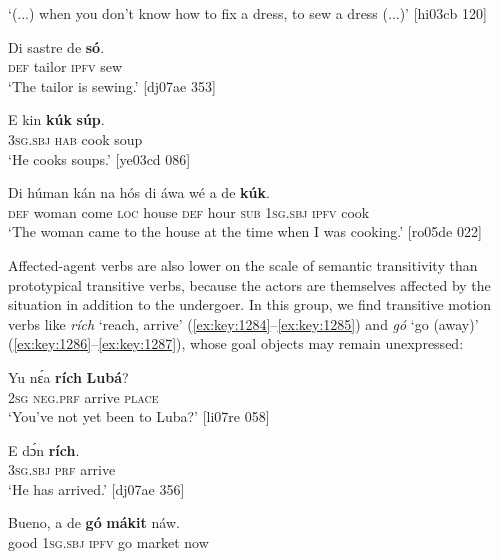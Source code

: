 \glt ‘(...) when you don’t know how to fix a dress, to sew a dress (...)’ [hi03cb 120]
\z


\ea%
    \label{ex:key:1281}
    \gll Di  sastre  de    \textbf{só}.\\
\textsc{def}  tailor  \textsc{ipfv}    sew\\

\glt ‘The tailor is sewing.’ [dj07ae 353]
\z


\ea%
    \label{ex:key:1282}
    \gll E    kin  \textbf{kúk}    \textbf{súp}.\\
\textsc{3sg.sbj}  \textsc{hab}  cook  soup\\

\glt ‘He cooks soups.’ [ye03cd 086]
\z


\ea%
    \label{ex:key:1283}
    \gll Di  húman  kán    na  hós    di  áwa    wé  a    de  \textbf{kúk}.\\
\textsc{def}  woman  come  \textsc{loc}  house  \textsc{def}  hour  \textsc{sub}  \textsc{1sg.sbj}  \textsc{ipfv}  cook\\

\glt ‘The woman came to the house at the time when I was cooking.’ [ro05de 022]
\z

Affected-agent verbs are also lower on the scale of semantic transitivity than prototypical transitive verbs, because the actors are themselves affected by the situation in addition to the undergoer. In this group, we find transitive motion verbs like \textit{rích} ‘reach, arrive’ (\ref{ex:key:1284}–\ref{ex:key:1285}) and \textit{gó} ‘go (away)’ (\ref{ex:key:1286}–\ref{ex:key:1287}), whose goal objects may remain unexpressed: 


\ea%
    \label{ex:key:1284}
    \gll Yu  nɛ́a    \textbf{rích}    \textbf{Lubá}?\\
\textsc{2sg}  \textsc{neg}.\textsc{prf}  arrive  \textsc{place}\\

\glt ‘You’ve not yet been to Luba?’ [li07re 058]
\z


\ea%
    \label{ex:key:1285}
    \gll E    dɔ́n    \textbf{rích}.\\
\textsc{3sg.sbj}  \textsc{prf}    arrive\\

\glt ‘He has arrived.’ [dj07ae 356]
\z


\ea%
    \label{ex:key:1286}
    \gll Bueno,  a    de  \textbf{gó}  \textbf{mákit}  náw.\\
good  \textsc{1sg.sbj}  \textsc{ipfv}  go  market  now\\

